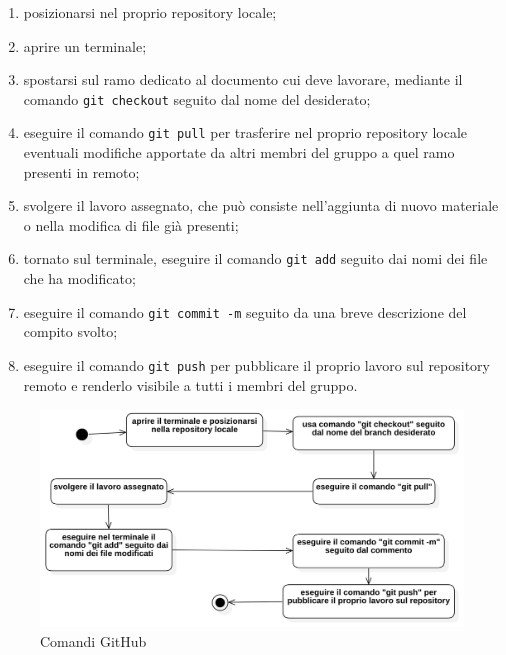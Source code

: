                 \begin{enumerate}
                    \item posizionarsi nel proprio repository locale;
                    \item aprire un terminale;
                    \item spostarsi sul ramo dedicato al documento cui deve lavorare, mediante il comando \texttt{git checkout} seguito dal nome del  desiderato;
                    \item eseguire il comando \texttt{git pull} per trasferire nel proprio repository locale eventuali modifiche apportate da altri membri del gruppo a quel ramo presenti in remoto;
                    \item svolgere il lavoro assegnato, che può consiste nell'aggiunta di nuovo materiale o nella modifica di file già presenti;
                    \item tornato sul terminale, eseguire il comando \texttt{git add} seguito dai nomi dei file che ha modificato;
                    \item eseguire il comando \texttt{git commit -m} seguito da una breve descrizione del compito svolto;
                    \item eseguire il comando \texttt{git push} per pubblicare il proprio lavoro sul repository remoto e renderlo visibile a tutti i membri del gruppo.
                \end{enumerate}
                
                \begin{figure}[H]
                        \centering
                        \includegraphics[width=1.0\textwidth]{res/images/comandi_GitHub.png}
                    \caption{Comandi GitHub}
                    \label{Comandi GitHub: diagramma delle attività di modifica al Repository}
                \end{figure}
                
